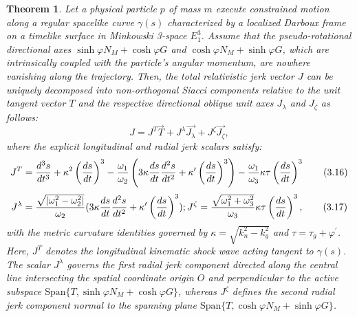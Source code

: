 \documentclass[reqno]{amsart}
\newtheorem{theorem}{Theorem}
\theoremstyle{plain}
\numberwithin{equation}{section}
\begin{document}
\begin{theorem}
Let a physical particle $p$ of mass $m$ execute constrained motion along a regular spacelike curve $\gamma(s)$ characterized by a localized Darboux frame on a timelike surface in Minkowski 3-space $E_1^3$. Assume that the pseudo-rotational directional axes $\sinh \varphi N_{M} + \cosh \varphi G$ and $\cosh \varphi N_{M} + \sinh \varphi G$, which are intrinsically coupled with the particle's angular momentum, are nowhere vanishing along the trajectory. Then, the total relativistic jerk vector $J$ can be uniquely decomposed into non-orthogonal Siacci components relative to the unit tangent vector $T$ and the respective directional oblique unit axes $J_{\lambda}$ and $J_{\zeta}$ as follows:
\begin{equation}
J=J^{T}\overrightarrow{T}+J^{\lambda }\overrightarrow{J_{\lambda }}+J^{\zeta
}\overrightarrow{J_{\zeta }},  \tag{3.15}
\end{equation}%
where the explicit longitudinal and radial jerk scalars satisfy:
\begin{equation}
J^{T}=\frac{d^{3}s}{dt^{3}}+\kappa ^{2}\left( \frac{ds}{dt}\right) ^{3}-%
\frac{\omega _{1}}{\omega _{2}}\left( 3\kappa \frac{ds}{dt}\frac{d^{2}s}{%
dt^{2}}+\kappa ^{\prime }\left( \frac{ds}{dt}\right) ^{3}\right) -\frac{%
\omega _{1}}{\omega _{3}}\kappa \tau \left( \frac{ds}{dt}\right) ^{3} 
\tag{3.16}
\end{equation}%
\begin{equation}
J^{\lambda }=\frac{\sqrt{\vert\omega _{1}^{2}-\omega _{2}^{2}\vert}}{\omega _{2}}%
(3\kappa \frac{ds}{dt}\frac{d^{2}s}{dt^{2}}+\kappa ^{\prime }\left( \frac{ds%
}{dt}\right) ^{3});J^{\zeta }=\frac{\sqrt{\omega _{1}^{2}+\omega _{3}^{2}}}{%
\omega _{3}}\kappa \tau \left( \frac{ds}{dt}\right) ^{3},  \tag{3.17}
\end{equation}%
with the metric curvature identities governed by $\kappa = \sqrt{k_{n}^{2} - k_{g}^{2}}$ and $\tau = \tau_{g} + \varphi^{\prime}$. Here, $J^{T}$ denotes the longitudinal kinematic shock wave acting tangent to $\gamma(s)$. The scalar $J^{\lambda}$ governs the first radial jerk component directed along the central line intersecting the spatial coordinate origin $O$ and perpendicular to the active subspace $\text{Span}\{T, \sinh \varphi N_{M} + \cosh \varphi G\}$, whereas $J^{\zeta}$ defines the second radial jerk component normal to the spanning plane $\text{Span}\{T, \cosh \varphi N_{M} + \sinh \varphi G\}$.
\end{theorem}
\end{document}

